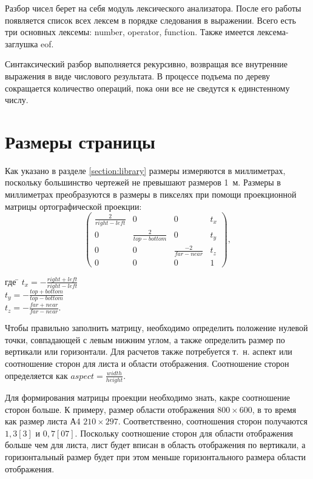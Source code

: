 \documentclass[a4paper, 12pt]{article}
\begin{document}
Разбор чисел берет на себя модуль лексического анализатора. После его работы
появляется список всех лексем в порядке следования в выражении. Всего есть
три основных лексемы: number, operator, function. Также имеется лексема-заглушка
eof.

Синтаксический разбор выполняется рекурсивно, возвращая все внутренние выражения
в виде числового результата. В процессе подъема по дереву сокращается количество
операций, пока они все не сведутся к единстенному числу.

\section{Размеры страницы}
Как указано в разделе \ref{section:library} размеры измеряются в миллиметрах,
поскольку большинство чертежей не превышают размеров 1~м. Размеры в миллиметрах
преобразуются в размеры в пикселях при помощи проекционной матрицы
ортографической проекции:
\begin{equation}
  \begin{pmatrix}
    \frac{2}{right - left} & 0 & 0 & t_x \\
    0 & \frac{2}{top - bottom} & 0 & t_y \\
    0 & 0 & \frac{-2}{far - near} & t_z \\
    0 & 0 & 0 & 1
  \end{pmatrix},
\end{equation}

\begin{tabbing}
где \= $t_x = -\frac{right + left}{right - left}$ \\
\> $t_y = -\frac{top + bottom}{top - bottom}$ \\
\> $t_z = -\frac{far + near}{far - near}$.
\end{tabbing}

Чтобы правильно заполнить матрицу, необходимо определить положение нулевой точки,
совпадающей с левым нижним углом, а также определить размер по вертикали или
горизонтали. Для расчетов также потребуется т.~н. аспект или соотношение сторон
для листа и области отображения. Соотношение сторон определяется как
$aspect = \frac{width}{height}$.

Для формирования матрицы проекции необходимо знать, какре соотношение сторон
больше. К примеру, размер области отображения $800\times 600$, в то время как
размер листа А4 $210\times 297$. Соответственно, соотношения сторон получаются
$1,3[3]$ и $0,7[07]$. Поскольку соотношение сторон для области отображения больше
чем для листа, лист будет вписан в область отображения по вертикали, а
горизонтальный размер будет при этом меньше горизонтального размера области
отображения.
\end{document}
